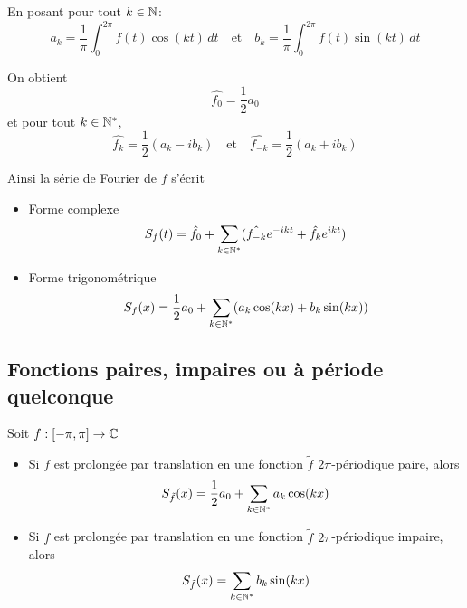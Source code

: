 \documentclass[a4paper, 12pt]{article}
\begin{document}
\begin{theoreme}{}{}
    En posant pour tout $k \in \mathbb{N}$:
    $$
    a_k = \frac{1}{\pi} \int_0^{2\pi} f(t) \cos(kt) \, dt \quad \text{et} \quad b_k = \frac{1}{\pi} \int_0^{2\pi} f(t) \sin(kt) \, dt
    $$

    On obtient
    $$
    \hat{f_0} = \frac{1}{2} a_0
    $$
    et pour tout $k \in \mathbb{N}^*$,
    $$
    \hat{f_k} = \frac{1}{2} (a_k - i b_k) \quad \text{et} \quad \hat{f_{-k}} = \frac{1}{2} (a_k + i b_k)
    $$

    Ainsi la série de Fourier de $f$ s'écrit
    
    \begin{itemize}[label=\textbullet]
        \item Forme complexe
        $$
        S_f(t) = \hat{f_0} + \sum_{k \in \mathbb{N}^*} (\hat{f_{-k}} e^{-ikt} + \hat{f_k} e^{ikt})
        $$

        \item Forme trigonométrique
        $$
        S_f(x) = \frac{1}{2} a_0 + \sum_{k \in \mathbb{N}^*} (a_k \cos(kx) + b_k \sin(kx))
        $$
    \end{itemize}
\end{theoreme}

\subsection{Fonctions paires, impaires ou à période quelconque}

\begin{theoreme}{}{}
    Soit $f : [-\pi, \pi] \to \mathbb{C}$

    \begin{itemize}[label=\textbullet]
        \item Si $f$ est prolongée par translation en une fonction $\tilde{f}$ $2\pi$-périodique paire, alors
        $$
        S_{\tilde{f}}(x) = \frac{1}{2} a_0 + \sum_{k \in \mathbb{N}^*} a_k \cos(kx)
        $$

        \item Si $f$ est prolongée par translation en une fonction $\tilde{f}$ $2\pi$-périodique impaire, alors
        $$
        S_{\tilde{f}}(x) = \sum_{k \in \mathbb{N}^*} b_k \sin(kx)
        $$
    \end{itemize}
\end{theoreme}
\end{document}
